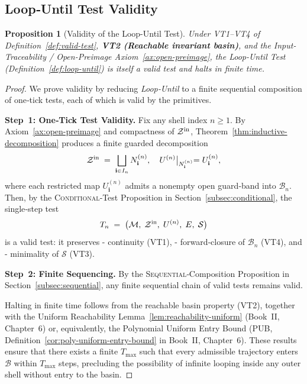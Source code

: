 \documentclass[12pt]{article}
\theoremstyle{definition}
\theoremstyle{plain}
\newtheorem{proposition}{Proposition}[section]
\begin{document}
\subsection{Loop‑Until Test Validity}
\label{subsec:loop-until-validity}

\begin{proposition}[Validity of the Loop-Until Test]
\label{prop:loop-until-valid-test}
Under VT1–VT4 of Definition~\ref{def:valid-test}, \textbf{VT2 (Reachable invariant basin)}, and the Input-Traceability / Open-Preimage Axiom~\ref{ax:open-preimage}, the Loop-Until Test (Definition~\ref{def:loop-until}) is itself a valid test and halts in finite time.
\end{proposition}

\begin{proof}
We prove validity by reducing \emph{Loop‑Until} to a finite sequential composition of one‑tick tests, each of which is valid by the primitives.

\smallskip\noindent\textbf{Step 1: One‑Tick Test Validity.}  
Fix any shell index $n\ge1$.  By Axiom~\ref{ax:open-preimage} and compactness of $\mathcal Z^{\rm in}$, Theorem~\ref{thm:inductive-decomposition} produces a finite guarded decomposition
\[
  \mathcal Z^{\rm in}
  \;=\;\bigsqcup_{\mathbf i\in I_n}N^{(n)}_{\mathbf i},
  \quad
  U^{(n)}\bigl|_{N^{(n)}_{\mathbf i}} = U^{(n)}_{\mathbf i},
\]
where each restricted map $U^{(n)}_{\mathbf i}$ admits a nonempty open guard‑band into $\mathcal B_n$.  Then, by the \textsc{Conditional}‑Test Proposition in Section~\ref{subsec:conditional}, the single‑step test
\[
  T_n \;=\;\bigl(\mathcal M,\;\mathcal Z^{\rm in},\;U^{(n)},\;E,\;\mathcal S\bigr)
\]
is a valid test: it preserves
- continuity (VT1),  
- forward‑closure of $\mathcal B_n$ (VT4), and  
- minimality of $\mathcal S$ (VT3).

\smallskip\noindent\textbf{Step 2: Finite Sequencing.}  
By the \textsc{Sequential}‑Composition Proposition in Section~\ref{subsec:sequential}, any finite sequential chain of valid tests remains valid.

Halting in finite time follows from the reachable basin property (VT2), together with the Uniform Reachability Lemma~\ref{lem:reachability-uniform} (Book~II, Chapter~6) or, equivalently, the Polynomial Uniform Entry Bound (PUB, Definition~\ref{cor:poly-uniform-entry-bound} in Book~II, Chapter~6). These results ensure that there exists a finite $T_{\max}$ such that every admissible trajectory enters $\mathcal{B}$ within $T_{\max}$ steps, precluding the possibility of infinite looping inside any outer shell without entry to the basin.


\end{proof}
\end{document}

